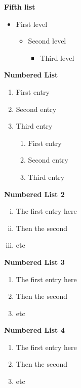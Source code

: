 \documentclass[11pt]{article}
\renewcommand{\labelitemi}{\textgreater}
\begin{document}
\textbf{Fifth list}
\renewcommand{\labelitemi}{\textgreater}
\renewcommand{\labelitemii}{$\star$}
\renewcommand{\labelitemiii}{$\bullet$}
\begin{itemize}
	\item First level
	      \begin{itemize}
		      \item Second level
		            \begin{itemize}
			            \item Third level
		            \end{itemize}
	      \end{itemize}
\end{itemize}

\textbf{Numbered List}
\begin{enumerate}
	\item First entry
	\item Second entry
	\item Third entry
	      \begin{enumerate}
		      \item First entry
		      \item Second entry
		      \item Third entry
	      \end{enumerate}
\end{enumerate}

\textbf{Numbered List 2}
\begin{enumerate}[(i)]
	\item The first entry here
	\item Then the second
	\item etc
\end{enumerate}

\textbf{Numbered List 3}
\begin{enumerate}[Exerc{i}se 1]
	\item The first entry here
	\item Then the second
	\item etc
\end{enumerate}

\textbf{Numbered List 4}
\begin{enumerate}[Exercise 1]
	\item The first entry here
	\item Then the second
	\item etc
\end{enumerate}

\end{document}

